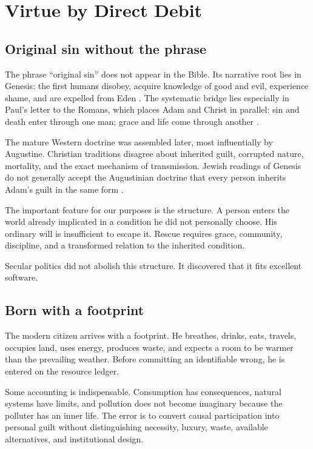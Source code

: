 \documentclass[12pt,a4paper]{book}
\begin{document}
\chapter{Virtue by Direct Debit}
\label{chap:virtue-direct-debit}

\section{Original sin without the phrase}

The phrase ``original sin'' does not appear in the Bible.  Its narrative root
lies in Genesis: the first humans disobey, acquire knowledge of good and evil,
experience shame, and are expelled from Eden \cite[Gen.~3]{NRSVue2021}.  The
systematic bridge lies especially in Paul's letter to the Romans, which places
Adam and Christ in parallel: sin and death enter through one man; grace and
life come through another \cite[Rom.~5:12--19]{NRSVue2021}.

The mature Western doctrine was assembled later, most influentially by
Augustine.  Christian traditions disagree about inherited guilt, corrupted
nature, mortality, and the exact mechanism of transmission.  Jewish readings
of Genesis do not generally accept the Augustinian doctrine that every person
inherits Adam's guilt in the same form
\cite{BeatriceTransmissionSin2013,HaymanRabbinicFall1984}.

The important feature for our purposes is the structure.  A person enters the
world already implicated in a condition he did not personally choose.  His
ordinary will is insufficient to escape it.  Rescue requires grace, community,
discipline, and a transformed relation to the inherited condition.

Secular politics did not abolish this structure.  It discovered that it fits
excellent software.

\section{Born with a footprint}

The modern citizen arrives with a footprint.  He breathes, drinks, eats,
travels, occupies land, uses energy, produces waste, and expects a room to be
warmer than the prevailing weather.  Before committing an identifiable wrong,
he is entered on the resource ledger.

Some accounting is indispensable.  Consumption has consequences, natural
systems have limits, and pollution does not become imaginary because the
polluter has an inner life.  The error is to convert causal participation into
personal guilt without distinguishing necessity, luxury, waste, available
alternatives, and institutional design.
\end{document}
